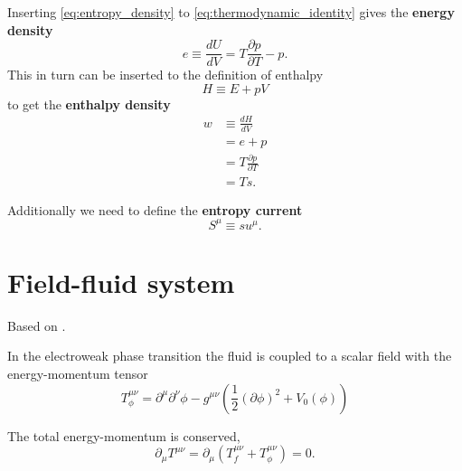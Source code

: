 Inserting \eqref{eq:entropy_density} to \eqref{eq:thermodynamic_identity} gives the \textbf{energy density}
\begin{equation}
e \equiv \frac{dU}{dV} = T \frac{\partial p}{\partial T} - p.
\label{eq:energy_density}
\end{equation}
This in turn can be inserted to the definition of enthalpy
\cite[eq. 1.51]{schroeder_thermal_2000}
\begin{equation}
H \equiv E + pV
\end{equation}
to get the \textbf{enthalpy density}
\begin{align}
w
&\equiv \frac{dH}{dV} \\
&= e+p
\label{eq:enthalpy_sum} \\
&= T \frac{\partial p}{\partial T}
\label{eq:enthalpy_pressure}\\
&= Ts.
\label{eq:enthalpy_entropy}
\end{align}
\iffalse
Additionally we need to define the \textbf{specific enthalpy} \cite[eq. 2.141]{rezzolla_relativistic_2013}
\begin{equation}
h = \frac{e+p}{\rho},
\label{eq:specific_enthalpy}
\end{equation}
where $\rho$ is the rest-mass density, and the \textbf{entropy current}
\fi
Additionally we need to define the \textbf{entropy current}
\cite[p. 23]{lecture_notes}
\begin{equation}
S^\mu \equiv su^\mu.
\end{equation}



\section{Field-fluid system}
Based on \cite{moore_pt_1995}.

In the electroweak phase transition the fluid is coupled to a scalar field with the energy-momentum tensor
\cites[eq. 2.9]{hindmarsh_gw_pt_2019}
\begin{equation}
T_\phi^{\mu \nu}
= \partial^\mu \partial^\nu \phi
- g^{\mu \nu} \left(\frac{1}{2} (\partial \phi)^2 + V_0 (\phi) \right)
\end{equation}

The total energy-momentum is conserved,
\cite[eq. 5.17]{lecture_notes}
\begin{equation}
\partial_\mu T^{\mu \nu} = \partial_\mu (T_f^{\mu \nu} + T_\phi^{\mu \nu}) = 0.
\label{eq:ep_conservation}
\end{equation}


